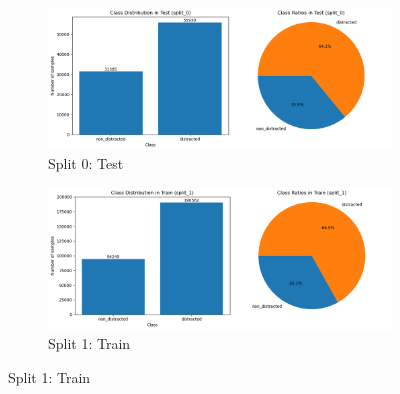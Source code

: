 \begin{figure}[htbp]
    \begin{subfigure}[b]{0.45\textwidth}
        \includegraphics[width=\textwidth]{Images_Thesis/class_distribution_Kinect_color/split_0_rgb_daa/class_dist_test_sp_0_rgb_daa.png}
        \caption{Split 0: Test}
        \label{fig:Class_dist_grid_image3}
    \end{subfigure}
    \hfill
    \begin{subfigure}[b]{0.45\textwidth}
        \includegraphics[width=\textwidth]{Images_Thesis/class_distribution_Kinect_color/split_1_rgb_daa/class_dist_train_rgb_sp_1_daa.png}
        \caption{Split 1: Train}
        \label{fig:Class_dist_grid_image4}
    \end{subfigure}


\end{figure}
